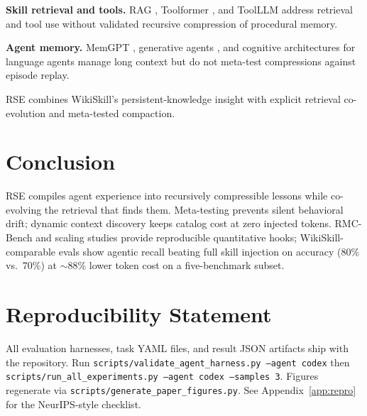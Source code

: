 \documentclass[11pt]{article}
\begin{document}
\textbf{Skill retrieval and tools.} RAG \citep{lewis2020rag}, Toolformer \citep{schick2024toolformer}, and ToolLLM \citep{qin2023toolllm} address retrieval and tool use without validated recursive compression of procedural memory.

\textbf{Agent memory.} MemGPT \citep{packer2023memgpt}, generative agents \citep{park2023generative}, and cognitive architectures for language agents \citep{sumers2024cognitive} manage long context but do not meta-test compressions against episode replay.

RSE combines WikiSkill's persistent-knowledge insight with explicit retrieval co-evolution and meta-tested compaction.

\section{Conclusion}
\label{sec:conclusion}

RSE compiles agent experience into recursively compressible lessons while co-evolving the retrieval that finds them.
Meta-testing prevents silent behavioral drift; dynamic context discovery keeps catalog cost at zero injected tokens.
RMC-Bench and scaling studies provide reproducible quantitative hooks; WikiSkill-comparable evals show agentic recall beating full skill injection on accuracy (80\% vs.\ 70\%) at $\sim$88\% lower token cost on a five-benchmark subset.

\section*{Reproducibility Statement}

All evaluation harnesses, task YAML files, and result JSON artifacts ship with the repository.
Run \texttt{scripts/validate\_agent\_harness.py --agent codex} then \texttt{scripts/run\_all\_experiments.py --agent codex --samples 3}.
Figures regenerate via \texttt{scripts/generate\_paper\_figures.py}.
See Appendix~\ref{app:repro} for the NeurIPS-style checklist.




\appendix

\end{document}
